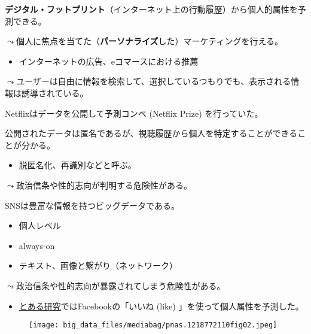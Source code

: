 \documentclass[
  xelatex,
  ja=standard]{bxjsarticle}
\providecommand{\tightlist}{%
  \setlength{\itemsep}{0pt}\setlength{\parskip}{0pt}}\usepackage{longtable,booktabs,array}
\begin{document}
\textbf{デジタル・フットプリント}（インターネット上の行動履歴）から個人的属性を予測できる。

\(\leadsto\)個人に焦点を当てた（\textbf{パーソナライズ}した）マーケティングを行える。

\begin{itemize}
\tightlist
\item
  インターネットの広告、eコマースにおける推薦
\end{itemize}

\(\leadsto\)ユーザーは自由に情報を検索して、選択しているつもりでも、表示される情報は誘導されている。

Netflixはデータを公開して予測コンペ (Netflix Prize) を行っていた。

公開されたデータは匿名であるが、視聴履歴から個人を特定することができることが分かる。

\begin{itemize}
\tightlist
\item
  脱匿名化、再識別などと呼ぶ。
\end{itemize}

\(\leadsto\)政治信条や性的志向が判明する危険性がある。

SNSは豊富な情報を持つビッグデータである。

\begin{itemize}
\tightlist
\item
  個人レベル
\item
  always-on
\item
  テキスト、画像と繋がり（ネットワーク）
\end{itemize}

\(\leadsto\)政治信条や性的志向が暴露されてしまう危険性がある。

\begin{itemize}
\tightlist
\item
  \href{https://www.axion.zone/private-traits-and-attributes-are-predictable-from-digital-records-of-human-behavior/}{とある研究}ではFacebookの「いいね
  (like) 」を使って個人属性を予測した。
\end{itemize}

\begin{figure}[htpb]

{\centering \texttt{[image: big\_data\_files/mediabag/pnas.1218772110fig02.jpeg]}

}

\caption{\citet{kosinski2013}}

\end{figure}
\end{document}
